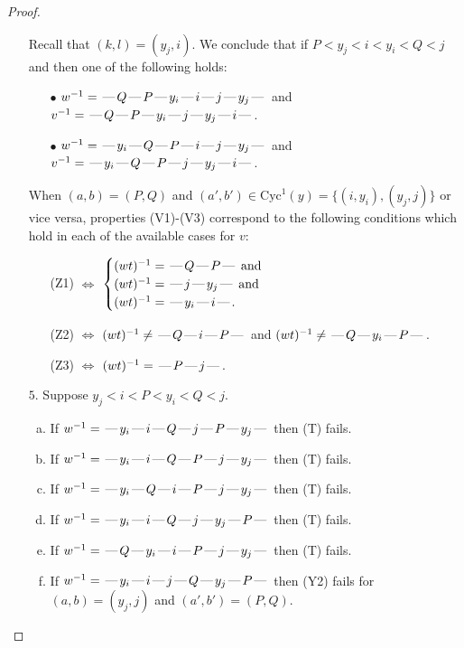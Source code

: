 \documentclass[10pt]{article}
\theoremstyle{definition}
\theoremstyle{definition}
\def\dash{\text{\hspace{0.5mm}---\hspace{0.5mm}}}
\def\Cyc{\mathrm{Cyc}}
\begin{document}
\begin{proof}
\begin{enumerate}
\begin{enumerate}[(a)]
\end{enumerate}
Recall that $(k,l) = (y_j,i)$.
We conclude that if $P < y_j < i < y_i < Q < j$ and then one of the following holds:
\begin{enumerate}
\item[$\bullet$] $w^{-1} = \dash Q\dash P\dash y_i\dash i\dash j\dash y_j\dash $ and $v^{-1} = \dash Q\dash P\dash y_i\dash j\dash y_j\dash i\dash $.
\item[$\bullet$] $w^{-1} = \dash y_i\dash Q\dash P\dash i\dash j\dash y_j\dash $ and $v^{-1} = \dash y_i\dash Q\dash P\dash j\dash y_j\dash i\dash $.
\end{enumerate}
When $(a,b)= (P,Q)$ and $(a',b')\in \Cyc^1(y)=\{(i,y_i),(y_j,j)\}$ or vice versa,
properties (V1)-(V3) correspond to the following conditions which hold in
each of the available cases for $v$:
\begin{enumerate}
\item[](Z1) $\Leftrightarrow$ $\begin{cases}\text{$(wt)^{-1} = \dash Q \dash P \dash$}\text{ and }\\
\text{$(wt)^{-1} = \dash j \dash y_j \dash$}\text{ and }\\
\text{$(wt)^{-1} = \dash y_i \dash i \dash$}.\end{cases}$
\item[](Z2) $\Leftrightarrow$ $(wt)^{-1} \neq \dash Q \dash i \dash P \dash$ and $(wt)^{-1}\neq \dash Q \dash y_i \dash P \dash$.
\item[](Z3) $\Leftrightarrow$ $(wt)^{-1} = \dash P \dash j \dash$.
\end{enumerate}
\item[$5$.] Suppose $y_j < i < P < y_i < Q < j$.
\begin{enumerate}[(a)]
\item If $w^{-1} = \dash y_i\dash i\dash Q\dash j\dash P\dash y_j\dash $ then (T) fails.
\item If $w^{-1} = \dash y_i\dash i\dash Q\dash P\dash j\dash y_j\dash $ then (T) fails.
\item If $w^{-1} = \dash y_i\dash Q\dash i\dash P\dash j\dash y_j\dash $ then (T) fails.
\item If $w^{-1} = \dash y_i\dash i\dash Q\dash j\dash y_j\dash P\dash $ then (T) fails.
\item If $w^{-1} = \dash Q\dash y_i\dash i\dash P\dash j\dash y_j\dash $ then (T) fails.
\item If $w^{-1} = \dash y_i\dash i\dash j\dash Q\dash y_j\dash P\dash $ then (Y2) fails for $(a,b)=(y_j,j)$ and $(a',b')=(P,Q)$.

\end{enumerate}
\end{enumerate}
\end{proof}
\end{document}
